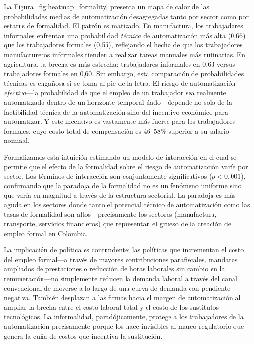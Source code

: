 \documentclass{article}
\begin{document}
La Figura~\ref{fig:heatmap_formality} presenta un mapa de calor de las probabilidades medias de automatizaci\'on desagregadas tanto por sector como por estatus de formalidad. El patr\'on es matizado. En manufactura, los trabajadores informales enfrentan una probabilidad \textit{t\'ecnica} de automatizaci\'on m\'as alta (0,66) que los trabajadores formales (0,55), reflejando el hecho de que los trabajadores manufactureros informales tienden a realizar tareas manuales m\'as rutinarias. En agricultura, la brecha es m\'as estrecha: trabajadores informales en 0,63 versus trabajadores formales en 0,60. Sin embargo, esta comparaci\'on de probabilidades t\'ecnicas es enga\~nosa si se toma al pie de la letra. El riesgo de automatizaci\'on \textit{efectivo}---la probabilidad de que el empleo de un trabajador sea realmente automatizado dentro de un horizonte temporal dado---depende no solo de la factibilidad t\'ecnica de la automatizaci\'on sino del incentivo econ\'omico para automatizar. Y este incentivo es vastamente m\'as fuerte para los trabajadores formales, cuyo costo total de compensaci\'on es 46--58\% superior a su salario nominal.

Formalizamos esta intuici\'on estimando un modelo de interacci\'on en el cual se permite que el efecto de la formalidad sobre el riesgo de automatizaci\'on var\'ie por sector. Los t\'erminos de interacci\'on son conjuntamente significativos ($p < 0{,}001$), confirmando que la paradoja de la formalidad no es un fen\'omeno uniforme sino que var\'ia en magnitud a trav\'es de la estructura sectorial. La paradoja es m\'as aguda en los sectores donde tanto el potencial t\'ecnico de automatizaci\'on como las tasas de formalidad son altos---precisamente los sectores (manufactura, transporte, servicios financieros) que representan el grueso de la creaci\'on de empleo formal en Colombia.

La implicaci\'on de pol\'itica es contundente: las pol\'iticas que incrementan el costo del empleo formal---a trav\'es de mayores contribuciones parafiscales, mandatos ampliados de prestaciones o reducci\'on de horas laborales sin cambio en la remuneraci\'on---no simplemente reducen la demanda laboral a trav\'es del canal convencional de moverse a lo largo de una curva de demanda con pendiente negativa. Tambi\'en desplazan a las firmas hacia el margen de automatizaci\'on al ampliar la brecha entre el costo laboral total y el costo de los sustitutos tecnol\'ogicos. La informalidad, parad\'ojicamente, protege a los trabajadores de la automatizaci\'on precisamente porque los hace invisibles al marco regulatorio que genera la cu\~na de costos que incentiva la sustituci\'on.
\end{document}

